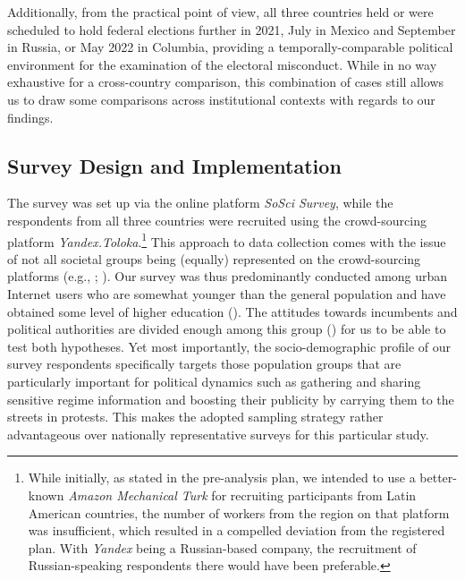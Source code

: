 \documentclass[11pt, ngerman,english,a4]{article}
\begin{document}
Additionally, from the practical point of view, all three countries held or were scheduled to hold federal elections further in 2021, July in Mexico and September in Russia, or May 2022 in Columbia, providing a temporally-comparable political environment for the examination of the electoral misconduct. While in no way exhaustive for a cross-country comparison, this combination of cases still allows us to draw some comparisons across institutional contexts with regards to our findings. 


\subsection*{Survey Design and Implementation}
The survey was set up via the online platform \textit{SoSci Survey}, while the respondents from all three countries were recruited using the crowd-sourcing platform \textit{Yandex.Toloka}.\footnote{
	While initially, as stated in the pre-analysis plan, we intended to use a better-known \textit{Amazon Mechanical Turk} for recruiting participants from Latin American countries, the number of workers from the region on that platform was insufficient, which resulted in a compelled deviation from the registered plan. 
	With \textit{Yandex} being a Russian-based company, the recruitment of Russian-speaking respondents there would have been preferable.} 
This approach to data collection comes with the issue of not all societal groups being (equally) represented on the crowd-sourcing platforms (e.g., \citealt{Bartneck2015}; \citealt{Berinsky2012}). 
Our survey was thus predominantly conducted among urban Internet users who are somewhat younger than the general population and have obtained some level of higher education (\citealt{Berinsky2012}). 
The attitudes towards incumbents and political authorities are divided enough among this group (\citealt{Robertson2017}) for us to be able to test both hypotheses. 
Yet most importantly, the socio-demographic profile of our survey respondents specifically targets those population groups that are particularly important for political dynamics such as gathering and sharing sensitive regime information and boosting their publicity by carrying them to the streets in protests.
This makes the adopted sampling strategy rather advantageous over nationally representative surveys for this particular study. 
\end{document}
